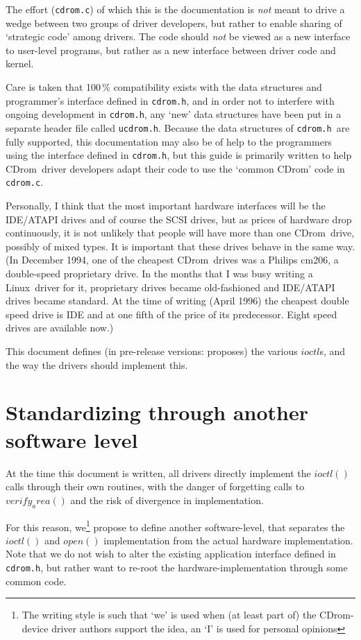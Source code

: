 \documentclass{article}
\def\linux{{\sc Linux}}
\def\cdrom{{\sc CDrom}}
\def\cdromc{{\tt cdrom.c}}
\def\cdromh{{\tt cdrom.h}}
\def\ucdrom{{\tt ucdrom.h}}
\begin{document}
The effort (\cdromc) of which this is the documentation is {\em not\/}
meant to drive a wedge between two groups of driver developers, but
rather to enable sharing of `strategic code' among drivers. The code
should {\em not\/} be viewed as a new interface to user-level
programs, but rather as a new interface between driver code and
kernel. 

Care is taken that 100\,\% compatibility exists with the data
structures and programmer's interface defined in \cdromh, and in order
not to interfere with ongoing development in \cdromh, any `new' data
structures have been put in a separate header file called \ucdrom.
Because the data structures of \cdromh\ are fully supported, this
documentation may also be of help to the programmers using the
interface defined in \cdromh, but this guide is primarily written to
help \cdrom\ driver developers adapt their code to use the `common
\cdrom' code in \cdromc.

Personally, I think that the most important hardware interfaces will
be the IDE/ATAPI drives and of course the SCSI drives, but as prices
of hardware drop continuously, it is not unlikely that people will
have more than one \cdrom\ drive, possibly of mixed types. It is
important that these drives behave in the same way. (In December 1994,
one of the cheapest \cdrom\ drives was a Philips cm206, a double-speed
proprietary drive. In the months that I was busy writing a \linux\ 
driver for it, proprietary drives became old-fashioned and IDE/ATAPI
drives became standard. At the time of writing (April 1996) the
cheapest double speed drive is IDE and at one fifth of the price of
its predecessor. Eight speed drives are available now.)

This document defines (in pre-release versions: proposes) the various
$ioctl$s, and the way the drivers should implement this.

\section{Standardizing through another software level}
\label{cdrom.c}

At the time this document is written, all drivers directly implement
the $ioctl()$ calls through their own routines, with the danger of
forgetting calls to $verify_area()$ and the risk of divergence in
implementation. 

For this reason, we\footnote{The writing style is such that `we' is
used when (at least part of) the \cdrom-device driver authors support
the idea, an `I' is used for personal opinions} propose to define
another software-level, that separates the $ioctl()$ and $open()$
implementation from the actual hardware implementation. Note that we
do not wish to alter the existing application interface defined in
\cdromh, but rather want to re-root the hardware-implementation through
some common code. 
\end{document}
